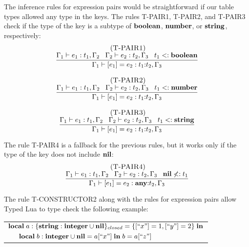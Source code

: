 The inference rules for expression pairs would be straightforward
if our table types allowed any type in the keys.
The rules \textsc{T-PAIR1}, \textsc{T-PAIR2}, and \textsc{T-PAIR3}
check if the type of the key is a subtype of $\mathbf{boolean}$, $\mathbf{number}$,
or $\mathbf{string}$, respectively:
\[
\begin{array}{c}
\begin{array}{c}
\; (\textsc{T-PAIR1})\\
\dfrac{\Gamma_{1} \vdash e_{1}:t_{1}, \Gamma_{2} \;\;\;
       \Gamma_{2} \vdash e_{2}:t_{2}, \Gamma_{3} \;\;\;
       t_{1} <: \mathbf{boolean}}
      {\Gamma_{1} \vdash [e_{1}] = e_{2}: t_{1}{:}t_{2}, \Gamma_{3}}
\end{array}
\\ \\
\begin{array}{c}
\; (\textsc{T-PAIR2})\\
\dfrac{\Gamma_{1} \vdash e_{1}:t_{1}, \Gamma_{2} \;\;\;
       \Gamma_{2} \vdash e_{2}:t_{2}, \Gamma_{3} \;\;\;
       t_{1} <: \mathbf{number}}
      {\Gamma_{1} \vdash [e_{1}] = e_{2}: t_{1}{:}t_{2}, \Gamma_{3}}
\end{array}
\\ \\
\begin{array}{c}
\; (\textsc{T-PAIR3})\\
\dfrac{\Gamma_{1} \vdash e_{1}:t_{1}, \Gamma_{2} \;\;\;
       \Gamma_{2} \vdash e_{2}:t_{2}, \Gamma_{3} \;\;\;
       t_{1} <: \mathbf{string}}
      {\Gamma_{1} \vdash [e_{1}] = e_{2}: t_{1}{:}t_{2}, \Gamma_{3}}
\end{array}
\end{array}
\]

The rule \textsc{T-PAIR4} is a fallback for the previous rules,
but it works only if the type of the key does not include $\mathbf{nil}$:
\[
\begin{array}{c}
\; (\textsc{T-PAIR4})\\
\dfrac{\Gamma_{1} \vdash e_{1}:t_{1}, \Gamma_{2} \;\;\;
       \Gamma_{2} \vdash e_{2}:t_{2}, \Gamma_{3} \;\;\;
       \mathbf{nil} \not<: t_{1}}
      {\Gamma_{1} \vdash [e_{1}] = e_{2}: \mathbf{any}{:}t_{2}, \Gamma_{3}}
\end{array}
\]

The rule \textsc{T-CONSTRUCTOR2} along with the rules for expression
pairs allow Typed Lua to type check the following example:
\begin{center}
\begin{tabular}{ll}
\multicolumn{2}{l}{$\mathbf{local} \; a:\{\mathbf{string}:\mathbf{integer} \cup \mathbf{nil}\}_{closed} = \{ [``x"] = 1, [``y"] = 2 \} \; \mathbf{in}$}\\
& \multicolumn{1}{l}{$\mathbf{local} \; b:\mathbf{integer} \cup \mathbf{nil} = a[``x"] \; \mathbf{in} \; b = a[``z"]$}
\end{tabular}
\end{center}

